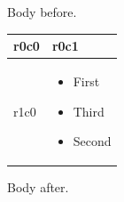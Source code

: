 \documentclass[11pt,a4paper]{article}
\begin{document}
Body before.

\begin{table}[h]
\begin{tabular}{|l|l|}
\hline
r0c0 & r0c1 \\ \hline
r1c0 & \begin{itemize} \item First \item Third \end{itemize}  \begin{itemize} \item Second \end{itemize} \\ \hline
\end{tabular}
\end{table}

Body after.
\end{document}
